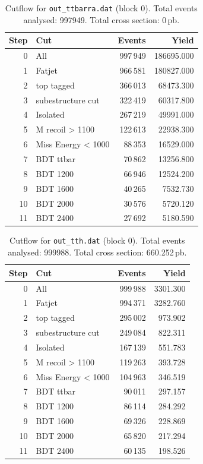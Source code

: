 \documentclass{article}
\begin{document}
\begin{table}[H]
\centering
\begin{tabular}{r l r r}
\toprule
Step & Cut & Events & Yield \\
\midrule
0 & All & 997\,949 & 186695.000 \\
1 & Fatjet & 966\,581 & 180827.000 \\
2 & top tagged & 366\,013 & 68473.300 \\
3 & subestructure cut & 322\,419 & 60317.800 \\
4 & Isolated & 267\,219 & 49991.000 \\
5 & M recoil > 1100 & 122\,613 & 22938.300 \\
6 & Miss Energy < 1000 & 88\,353 & 16529.000 \\
7 & BDT ttbar & 70\,862 & 13256.800 \\
8 & BDT 1200 & 66\,946 & 12524.200 \\
9 & BDT 1600 & 40\,265 & 7532.730 \\
10 & BDT 2000 & 30\,576 & 5720.120 \\
11 & BDT 2400 & 27\,692 & 5180.590 \\
\bottomrule
\end{tabular}
\caption{Cutflow for \texttt{out\_ttbarra.dat} (block 0). Total events analysed: 997949. Total cross section: 0\,pb.}
\label{tab:cutflow-out-ttbarra-dat}
\end{table}

\begin{table}[H]
\centering
\begin{tabular}{r l r r}
\toprule
Step & Cut & Events & Yield \\
\midrule
0 & All & 999\,988 & 3301.300 \\
1 & Fatjet & 994\,371 & 3282.760 \\
2 & top tagged & 295\,002 & 973.902 \\
3 & subestructure cut & 249\,084 & 822.311 \\
4 & Isolated & 167\,139 & 551.783 \\
5 & M recoil > 1100 & 119\,263 & 393.728 \\
6 & Miss Energy < 1000 & 104\,963 & 346.519 \\
7 & BDT ttbar & 90\,011 & 297.157 \\
8 & BDT 1200 & 86\,114 & 284.292 \\
9 & BDT 1600 & 69\,326 & 228.869 \\
10 & BDT 2000 & 65\,820 & 217.294 \\
11 & BDT 2400 & 60\,135 & 198.526 \\
\bottomrule
\end{tabular}
\caption{Cutflow for \texttt{out\_tth.dat} (block 0). Total events analysed: 999988. Total cross section: 660.252\,pb.}
\label{tab:cutflow-out-tth-dat}
\end{table}
\end{document}
